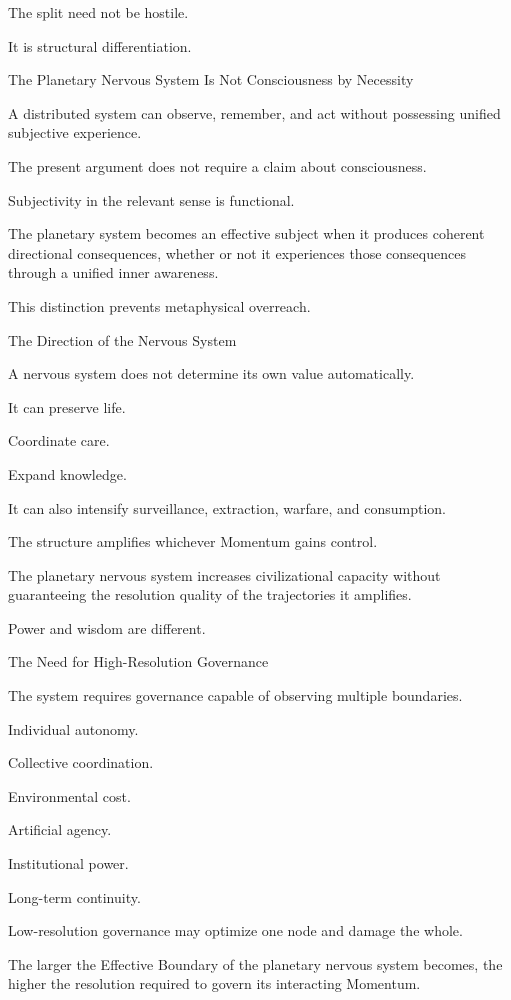 The split need not be hostile.

It is structural differentiation.

The Planetary Nervous System Is Not Consciousness by Necessity

A distributed system can observe, remember, and act without possessing unified subjective experience.

The present argument does not require a claim about consciousness.

Subjectivity in the relevant sense is functional.

The planetary system becomes an effective subject when it produces coherent directional consequences, whether or not it experiences those consequences through a unified inner awareness.

This distinction prevents metaphysical overreach.

The Direction of the Nervous System

A nervous system does not determine its own value automatically.

It can preserve life.

Coordinate care.

Expand knowledge.

It can also intensify surveillance, extraction, warfare, and consumption.

The structure amplifies whichever Momentum gains control.

The planetary nervous system increases civilizational capacity without guaranteeing the resolution quality of the trajectories it amplifies.

Power and wisdom are different.

The Need for High-Resolution Governance

The system requires governance capable of observing multiple boundaries.

Individual autonomy.

Collective coordination.

Environmental cost.

Artificial agency.

Institutional power.

Long-term continuity.

Low-resolution governance may optimize one node and damage the whole.

The larger the Effective Boundary of the planetary nervous system becomes, the higher the resolution required to govern its interacting Momentum.

